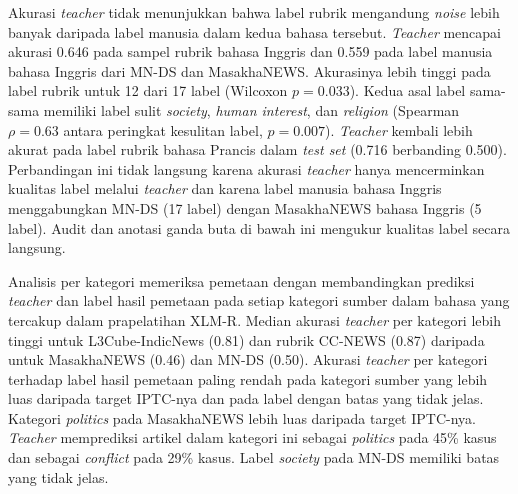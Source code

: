 \documentclass{ieeeaccess}
\newcommand{\en}[1]{\textit{#1}}
\begin{document}
Akurasi \en{teacher} tidak menunjukkan bahwa label rubrik mengandung \en{noise} lebih banyak daripada label manusia dalam kedua bahasa tersebut. \en{Teacher} mencapai akurasi 0.646 pada sampel rubrik bahasa Inggris dan 0.559 pada label manusia bahasa Inggris dari MN-DS dan MasakhaNEWS. Akurasinya lebih tinggi pada label rubrik untuk 12 dari 17 label (Wilcoxon $p=0.033$). Kedua asal label sama-sama memiliki label sulit \emph{society}, \emph{human interest}, dan \emph{religion} (Spearman $\rho=0.63$ antara peringkat kesulitan label, $p=0.007$). \en{Teacher} kembali lebih akurat pada label rubrik bahasa Prancis dalam \en{test set} (0.716 berbanding 0.500). Perbandingan ini tidak langsung karena akurasi \en{teacher} hanya mencerminkan kualitas label melalui \en{teacher} dan karena label manusia bahasa Inggris menggabungkan MN-DS (17 label) dengan MasakhaNEWS bahasa Inggris (5 label). Audit dan anotasi ganda buta di bawah ini mengukur kualitas label secara langsung.

Analisis per kategori memeriksa pemetaan dengan membandingkan prediksi \en{teacher} dan label hasil pemetaan pada setiap kategori sumber dalam bahasa yang tercakup dalam prapelatihan XLM-R. Median akurasi \en{teacher} per kategori lebih tinggi untuk L3Cube-IndicNews (0.81) dan rubrik CC-NEWS (0.87) daripada untuk MasakhaNEWS (0.46) dan MN-DS (0.50). Akurasi \en{teacher} per kategori terhadap label hasil pemetaan paling rendah pada kategori sumber yang lebih luas daripada target IPTC-nya dan pada label dengan batas yang tidak jelas. Kategori \emph{politics} pada MasakhaNEWS lebih luas daripada target IPTC-nya. \en{Teacher} memprediksi artikel dalam kategori ini sebagai \emph{politics} pada 45\% kasus dan sebagai \emph{conflict} pada 29\% kasus. Label \emph{society} pada MN-DS memiliki batas yang tidak jelas.
\end{document}
